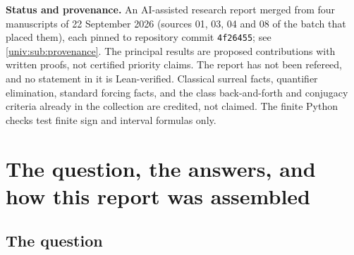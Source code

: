 \documentclass[11pt,letterpaper]{article}
\numberwithin{equation}{section}
\theoremstyle{definition}
\theoremstyle{remark}
\newcommand{\No}{\mathbf{No}}
\newcommand{\NoM}{\No^{M}}
\newcommand{\NoN}{\No^{N}}
\newcommand{\cf}{\operatorname{cf}}
\newcommand{\Add}{\operatorname{Add}}
\newcommand{\shorthash}{\texttt{4f26455}}
\begin{document}
\begin{titlepage}
\begin{minipage}{0.94\textwidth}
\begin{abstract}
Every gap of $\NoM$ with set-sized cofinal and coinitial witnesses comes from a
unique fresh sign, a new sign sequence all of whose proper prefixes are old.
Its fillers are exactly the sign extensions of that fresh sign, and every
such gap is symmetric. The first new birthday $\beta$ satisfies
$\delta\le\cf^N\beta\le\beta$. At the countable boundary, $\omega$-saturation
detects exactly the new reals. The pure field $\NoM[i]$ stays saturated over
every $N$-set, while naming conjugation restores the real spectrum. The old
field is closed and nowhere dense in $\NoN$, and each $N$-set of old numbers is
uniformly discrete. We also treat bounded birthday fragments and the Cohen,
$\Add(\kappa,1)$ and Prikry extensions. Under Global Choice, we give
nonconjugate real forms of $\NoN[i]$ none of which has a set-sized cofinal
subset. Finally we give a set-complete class Boolean algebra in which reverse
simplicity is dense; class-completeness is impossible under Global Choice.
\end{abstract}
\end{minipage}
\vfill
\begin{minipage}{0.94\textwidth}\small
\textbf{Status and provenance.} An AI-assisted research report merged from
four manuscripts of 22 September 2026 (sources 01, 03, 04 and 08 of the batch
that placed them), each pinned to repository commit \shorthash; see
\cref{univ:sub:provenance}. The principal results are proposed contributions
with written proofs, not certified priority claims. The report has not been
refereed, and no statement in it is Lean-verified. Classical surreal facts,
quantifier elimination, standard forcing facts, and the class back-and-forth
and conjugacy criteria already in the collection are credited, not claimed.
The finite Python checks test finite sign and interval formulas only.
\end{minipage}
\end{titlepage}
\hypersetup{pageanchor=true}
\setcounter{tocdepth}{2}
{\small\setlength{\parskip}{0pt}\tableofcontents}
\clearpage
{}

\section{The question, the answers, and how this report was assembled}\label{univ:sec:overview}

\subsection{The question}
\end{document}
